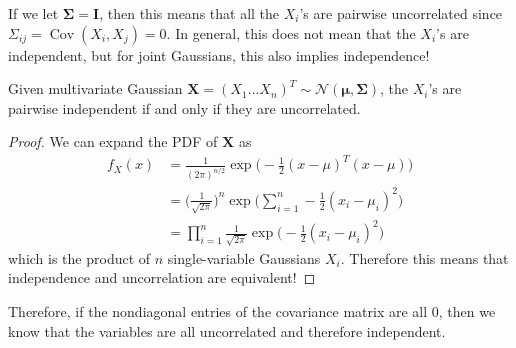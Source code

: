 \documentclass{article}
\DeclareMathOperator{\Cov}{Cov}
\begin{document}
  If we let $\boldsymbol{\Sigma} = \mathbf{I}$, then this means that all the $X_i$'s are pairwise uncorrelated since $\Sigma_{ij} = \Cov (X_i, X_j) = 0$. In general, this does not mean that the $X_i$'s are independent, but for joint Gaussians, this also implies independence! 

  \begin{theorem}
  Given multivariate Gaussian $\mathbf{X} = (X_1 \ldots X_n)^T \sim \mathcal{N}(\boldsymbol{\mu}, \boldsymbol{\Sigma})$, the $X_i$'s are pairwise independent if and only if they are uncorrelated. 
  \end{theorem}
  \begin{proof}
  We can expand the PDF of $\mathbf{X}$ as 
  \begin{align*}
      f_X (x) & = \frac{1}{(2 \pi)^{n/2}} \exp \bigg( -\frac{1}{2} (x - \mu)^T (x - \mu) \bigg) \\
      & = \bigg(\frac{1}{\sqrt{2\pi}} \bigg)^n \exp \bigg( \sum_{i=1}^n -\frac{1}{2} (x_i - \mu_i)^2 \bigg) \\
      & = \prod_{i=1}^n \frac{1}{\sqrt{2\pi}} \exp \bigg( -\frac{1}{2} (x_i - \mu_i)^2 \bigg)
  \end{align*}
  which is the product of $n$ single-variable Gaussians $X_i$. Therefore this means that independence and uncorrelation are equivalent! 
  \end{proof}

  Therefore, if the nondiagonal entries of the covariance matrix are all $0$, then we know that the variables are all uncorrelated and therefore independent. 
\end{document}
